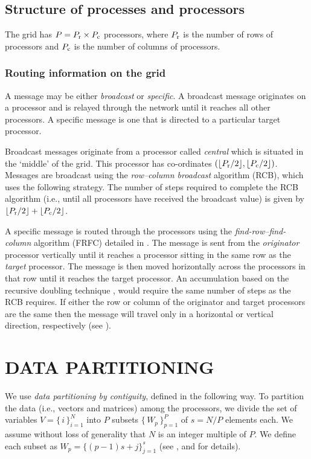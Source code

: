 \documentclass{ecai}
\begin{document}
\subsection{Structure of processes and processors}
\label{procstruct}
The grid has $P=P_{\rm{r}}\times P_{\rm{c}}$ processors, where
$P_{\rm{r}}$ is the number of rows of processors and $P_{\rm{c}}$ is
the number of columns of processors.

\subsubsection{Routing information on the grid}
\label{routing} A message may be either \emph{broadcast} or {\em
  specific}. A broadcast message originates on a processor and is
relayed through the network until it reaches all other processors. A
specific message is one that is directed to a particular target
processor.

Broadcast messages originate from a processor called \emph{central}
which is situated in the `middle' of the grid. This processor has
co-ordinates $(\lfloor P_{\rm{r}}/2 \rfloor,\lfloor P_{\rm{c}}/2
\rfloor)$.  Messages are broadcast using the \emph{row--column
  broadcast} algorithm (RCB), which uses the following strategy.  The
number of steps required to complete the RCB algorithm (i.e., until
all processors have received the broadcast value) is given by $\lfloor
P_{\rm{r}}/2\rfloor+\lfloor P_{\rm{c}}/2\rfloor$.

A specific message is routed through the processors using the
\emph{find-row--find-column} algorithm (FRFC) detailed in
\cite{kn:deCarlini91}.  The message is sent from the \emph{originator}
processor vertically until it reaches a processor sitting in the same
row as the \emph{target} processor. The message is then moved
horizontally across the processors in that row until it reaches the
target processor. An accumulation based on the recursive doubling
technique \cite[pp. 56--61]{kn:Modi88}, would require the same number
of steps as the RCB requires. If either the row or column of the
originator and target processors are the same then the message will
travel only in a horizontal or vertical direction, respectively (see
\cite{kn:Smith85}).

\section{DATA PARTITIONING}
\label{datapart}
We use \emph{data partitioning by contiguity}, defined in the
following way. To partition the data (i.e., vectors and matrices)
among the processors, we divide the set of variables
\mbox{$V=\{\,i\,\}_{i=1}^{N}$} into $P$ subsets
$\{\,W_{p}\,\}_{p=1}^{P}$ of $s=N/P$ elements each. We assume without
loss of generality that $N$ is an integer multiple of $P$. We define
each subset as $W_{p}=\{(p-1)s+j\}_{j=1}^{s}$ (see
\cite{kn:Schofield89}, \cite{kn:daCunha92a} and \cite{kn:Atkin} for
details).
\end{document}

